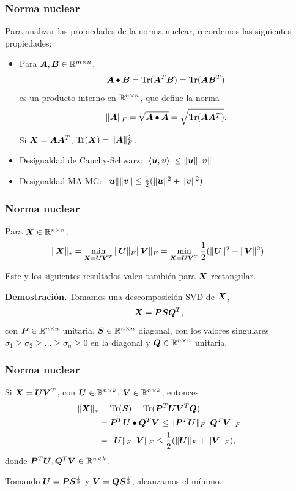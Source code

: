 \documentclass[aspectratio=169,12pt,spanish]{beamer}
\begin{document}
\begin{frame}
\frametitle{Norma nuclear}


Para analizar las propiedades de la norma nuclear, recordemos las siguientes propiedades:
\begin{itemize}
\item Para $\bm{A}, \bm{B} \in \mathbb{R}^{m \times n}$,
$$\bm{A} \bullet \bm{B} = \operatorname{Tr}(\bm{A}^T \bm{B})= \operatorname{Tr}(\bm{A} \bm{B}^T)$$
es un producto interno en $\mathbb{R}^{n \times n}$, que define la norma
$$\|\bm{A}\|_F = \sqrt{\bm{A} \bullet \bm{A}} = \sqrt{\operatorname{Tr}(\bm{A} \bm{A}^T)}.$$

Si $\bm{X} = \bm{A} \bm{A}^T$, $\operatorname{Tr}(\bm{X}) = \|\bm{A}\|_F^2$.
\item Desigualdad de Cauchy-Schwarz: $|\langle \bm{u}, \bm{v} \rangle| \le \|\bm{u}\| \|\bm{v}\|$
\item Desigualdad MA-MG: $\|\bm{u}\| \|\bm{v}\| \le \frac{1}{2}(\|\bm{u}\|^2 + \|\bm{v}\|^2)$
\end{itemize}

\end{frame}


\begin{frame}
\frametitle{Norma nuclear}

\begin{lemma}
Para $\bm{X} \in \mathbb{R}^{n \times n}$,
$$
\|\bm{X}\|_* = \min_{\bm{X} = \bm{U} \bm{V}^T} \|\bm{U}\|_{F} \|\bm{V}\|_{F} = \min_{\bm{X} = \bm{U} \bm{V}^T} \frac{1}{2}(\|\bm{U}\|^2 + \|\bm{V}\|^2).
 $$
\end{lemma}

{\small Este y los siguientes resultados valen también para $\bm{X}$ rectangular.}

\textbf{Demostración.} Tomamos una descomposición SVD de $\bm{X}$,
$$\bm{X} = \bm{P} \bm{S} \bm{Q}^T,$$
con $\bm{P} \in \mathbb{R}^{n \times n}$ unitaria, $\bm{S} \in \mathbb{R}^{n \times n}$ diagonal, con los valores singulares $\sigma_1 \ge \sigma_2 \ge \dots \ge \sigma_n \ge 0$ en la diagonal y $\bm{Q} \in \mathbb{R}^{n \times n}$ unitaria.

\end{frame}


\begin{frame}
\frametitle{Norma nuclear}

Si $\bm{X} = \bm{U} \bm{V}^T$, con $\bm{U} \in \mathbb{R}^{n \times k}$, $\bm{V} \in \mathbb{R}^{n \times k}$, entonces
\begin{align*}
\|\bm{X}\|_* &= \operatorname{Tr}(\bm{S}) = \operatorname{Tr}(\bm{P}^T \bm{U} \bm{V}^T \bm{Q}) \\
&= \bm{P}^T \bm{U} \bullet \bm{Q}^T \bm{V} \le \|\bm{P}^T \bm{U}\|_F\|\bm{Q}^T \bm{V}\|_F \\
&=  \|\bm{U}\|_F\|\bm{V}\|_F \le \frac{1}{2}(\|\bm{U}\|_F + \|\bm{V}\|_F),
\end{align*}
donde $\bm{P}^T\bm{U}, \bm{Q}^T\bm{V} \in \mathbb{R}^{n \times k}$.

Tomando $\bm{U} = \bm{P} \bm{S}^{\frac12}$ y $\bm{V} = \bm{Q} \bm{S}^{\frac12}$, alcanzamos el mínimo.
\end{frame}
\end{document}
